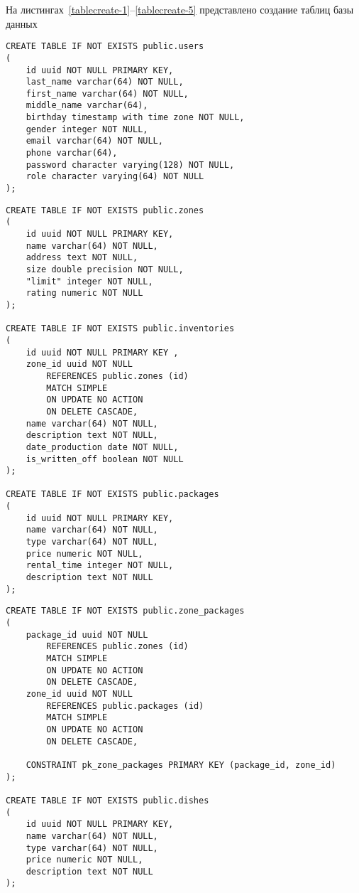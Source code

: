На листингах~\ref{tablecreate-1}--\ref{tablecreate-5} представлено создание таблиц базы данных

\begin{center}
	\begin{lstlisting}[label=tablecreate-1, caption=Создание таблицы users]
CREATE TABLE IF NOT EXISTS public.users
(
	id uuid NOT NULL PRIMARY KEY,
	last_name varchar(64) NOT NULL,
	first_name varchar(64) NOT NULL,
	middle_name varchar(64),
	birthday timestamp with time zone NOT NULL,
	gender integer NOT NULL,
	email varchar(64) NOT NULL,
	phone varchar(64),
	password character varying(128) NOT NULL,
	role character varying(64) NOT NULL
);
	\end{lstlisting}
\end{center}

\clearpage

\begin{center}
	\begin{lstlisting}[label=tablecreate-2, caption=Создание таблиц zones inventories packages]		
CREATE TABLE IF NOT EXISTS public.zones
(
	id uuid NOT NULL PRIMARY KEY,
	name varchar(64) NOT NULL,
	address text NOT NULL,
	size double precision NOT NULL,
	"limit" integer NOT NULL,
	rating numeric NOT NULL
);

CREATE TABLE IF NOT EXISTS public.inventories
(
	id uuid NOT NULL PRIMARY KEY ,
	zone_id uuid NOT NULL 
	    REFERENCES public.zones (id) 
		MATCH SIMPLE
		ON UPDATE NO ACTION
		ON DELETE CASCADE,
	name varchar(64) NOT NULL,
	description text NOT NULL,
	date_production date NOT NULL,
	is_written_off boolean NOT NULL      
);

CREATE TABLE IF NOT EXISTS public.packages
(
	id uuid NOT NULL PRIMARY KEY,
	name varchar(64) NOT NULL,
	type varchar(64) NOT NULL,
	price numeric NOT NULL,
	rental_time integer NOT NULL,
	description text NOT NULL
);
	\end{lstlisting}
\end{center}

\clearpage

\begin{center}
	\begin{lstlisting}[label=tablecreate-3, caption=Создание ассоциативной таблицы zone\_packages и таблицы dishes]		
CREATE TABLE IF NOT EXISTS public.zone_packages
(
	package_id uuid NOT NULL
		REFERENCES public.zones (id) 
		MATCH SIMPLE
		ON UPDATE NO ACTION
		ON DELETE CASCADE,
	zone_id uuid NOT NULL 
		REFERENCES public.packages (id)
		MATCH SIMPLE
		ON UPDATE NO ACTION
		ON DELETE CASCADE,
	
	CONSTRAINT pk_zone_packages PRIMARY KEY (package_id, zone_id)
);

CREATE TABLE IF NOT EXISTS public.dishes
(
	id uuid NOT NULL PRIMARY KEY,
	name varchar(64) NOT NULL,
	type varchar(64) NOT NULL,
	price numeric NOT NULL,
	description text NOT NULL
);

	\end{lstlisting}
\end{center}

